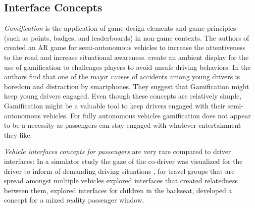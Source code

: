 \subsection{Interface Concepts}
\emph{Gamification} is the application of game design elements and game principles (such as points, badges, and leaderboards) in non-game contexts.
The authors of \cite{Schroeter2016} created an AR game for semi-autonomous vehicles to increase the attentiveness to the road and increase situational awareness.\cite{Rodriguez2014} create an ambient display for the use of gamification to challenges players to avoid unsafe driving behaviors.  In \cite{Schroeter} the authors find that one of the major causes of accidents among young drivers is boredom and distraction by smartphones. They suggest that Gamification might keep young drivers engaged. Even though these concepts are relatively simple, Gamification might be a valuable tool to keep drivers engaged with their semi-autonomous vehicles. For fully autonomous vehicles gamification does not appear to be a necessity as passengers can stay engaged with whatever entertainment they like. 

\emph{Vehicle interfaces concepts for passengers} are very rare compared to driver interfaces: In a simulator study the gaze of the co-driver was visualized for the driver to inform of demanding driving situations \cite{Trosterer}, for travel groups that are spread amongst multiple vehicles \cite{Knobel2012} explored interfaces that created relatedness between them, \cite{Wilfinger2011} explored interfaces for children in the backseat, \cite{Hakkila2014} developed a concept for a mixed reality passenger window. 

  

